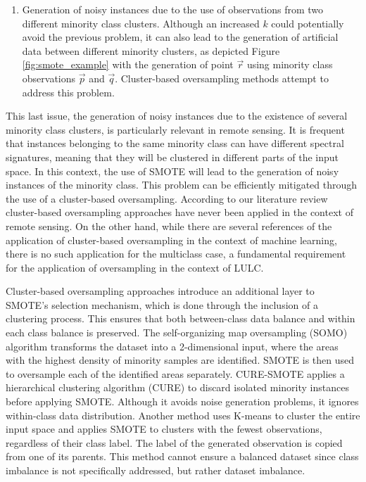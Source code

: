 \documentclass[remotesensing,article,submit,moreauthors,pdftex]{Definitions/mdpi}
\begin{document}
\begin{paracol}{2}
\begin{enumerate}
    \item Generation of noisy instances due to the use of observations from two
        different minority class clusters. Although an increased $k$ could
        potentially avoid the previous problem, it can also lead to the
        generation of artificial data between different minority clusters, as
        depicted Figure \ref{fig:smote_example} with the generation of point
        $\overrightarrow{r}$ using minority class observations
        $\overrightarrow{p}$ and $\overrightarrow{q}$. Cluster-based
        oversampling methods attempt to address this problem. 
\end{enumerate}

This last issue, the generation of noisy instances due to the existence of
several minority class clusters, is particularly relevant in remote sensing. It
is frequent that instances belonging to the same minority class can have
different spectral signatures, meaning that they will be clustered in different
parts of the input space. In this context, the use of SMOTE will lead to the
generation of noisy instances of the minority class. This problem can be
efficiently mitigated through the use of a cluster-based oversampling. According
to our literature review cluster-based oversampling approaches have never been
applied in the context of remote sensing. On the other hand, while there are
several references of the application of cluster-based oversampling in the
context of machine learning, there is no such application for the multiclass
case, a fundamental requirement for the application of oversampling in the
context of LULC. 

Cluster-based oversampling approaches introduce an additional layer to
SMOTE's selection mechanism, which is done through the inclusion of a clustering
process. This ensures that both between-class data balance and within each class
balance is preserved. The self-organizing map
oversampling (SOMO) \cite{Douzas2017} algorithm transforms the dataset into a
2-dimensional input, where the areas with the highest density of minority
samples are identified. SMOTE is then used to oversample each of the identified
areas separately. CURE-SMOTE \cite{Ma2017} applies a hierarchical clustering
algorithm (CURE) to discard isolated minority instances before applying SMOTE.
Although it avoids noise generation problems, it ignores within-class data
distribution. Another method \cite{Santos2015} uses K-means to cluster the
entire input space and applies SMOTE to clusters with the fewest observations,
regardless of their class label. The label of the generated observation is
copied from one of its parents. This method cannot ensure a balanced dataset
since class imbalance is not specifically addressed, but rather dataset
imbalance.


\end{paracol}
\end{document}
